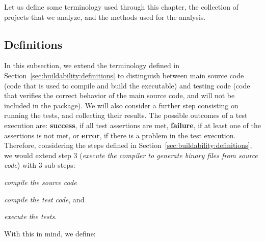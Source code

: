 
Let us define some terminology used through this chapter, the collection of projects that we analyze, and the methods used for the analysis.

\subsection{Definitions}
\label{subsec:definitions}

In this subsection, we extend the terminology defined in Section~\ref{sec:buildability:definitions} to distinguish between main source code (code that is used to compile and build the executable) and testing code (code that verifies the correct behavior of the main source code, and will not be included in the package). 
We will also consider a further step consisting on running the tests, and collecting their results. 
The possible outcomes of a test execution are: \textbf{success}, if all test assertions are met, \textbf{failure}, if at least one of the assertions is not met, or \textbf{error}, if there is a problem in the test execution.
Therefore, considering the steps defined in Section~\ref{sec:buildability:definitions}, we would extend step 3 (\textit{execute the compiler to generate binary files from source code}) with 3 sub-steps:
\begin{inparaenum}[\bf(1)]
    \item \textit{compile the source code}
    \item \textit{compile the test code}, and
    \item \textit{execute the tests}.
\end{inparaenum}
With this in mind, we define:


